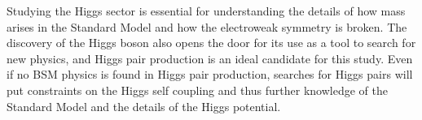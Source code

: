 Studying the Higgs sector is essential for understanding the details of how mass arises in the Standard Model and how the electroweak symmetry is broken. The discovery of the Higgs boson also opens the door for its use as a tool to search for new physics, and Higgs pair production is an ideal candidate for this study. Even if no BSM physics is found in Higgs pair production, searches for Higgs pairs will put constraints on the Higgs self coupling and thus further knowledge of the Standard Model and the details of the Higgs potential. 






